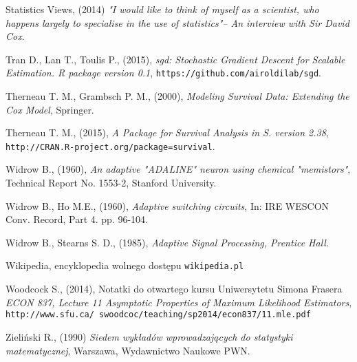 \begin{thebibliography}{99}
 Statistics Views, (2014) \textit{ "I would like to think of myself as a scientist, who happens largely to specialise in the use of statistics"– An interview with Sir David Cox}. 

 Tran D., Lan T., Toulis P., (2015), \textit{sgd: Stochastic Gradient Descent for Scalable Estimation. R package version 0.1}, \texttt{https://github.com/airoldilab/sgd}.

 Therneau T. M., Grambsch P. M., (2000), \textit{Modeling Survival Data: Extending the Cox Model}, Springer.

 Therneau T. M., (2015), \textit{A Package for Survival Analysis in S. version 2.38}, \texttt{http://CRAN.R-project.org/package=survival}.


 Widrow B., (1960), \textit{An adaptive "ADALINE" neuron using chemical "memistors"}, Technical Report No. 1553-2, Stanford University.

 Widrow B., Ho M.E., (1960), \textit{Adaptive switching circuits}, In: IRE WESCON Conv.
Record, Part 4. pp. 96-104.

 Widrow B., Stearns S. D., (1985), \textit{Adaptive Signal Processing, Prentice Hall}.

 Wikipedia, encyklopedia wolnego dostępu \texttt{wikipedia.pl}
 
  Woodcock S., (2014), Notatki do otwartego kursu Uniwersytetu Simona Frasera \textit{ECON 837, Lecture 11 Asymptotic Properties of Maximum Likelihood Estimators}, \\ \texttt{http://www.sfu.ca/~swoodcoc/teaching/sp2014/econ837/11.mle.pdf}
 
 Zieliński R., (1990) \textit{Siedem wykładów wprowadzających do statystyki matematycznej}, Warszawa, Wydawnictwo Naukowe PWN.


\end{thebibliography}